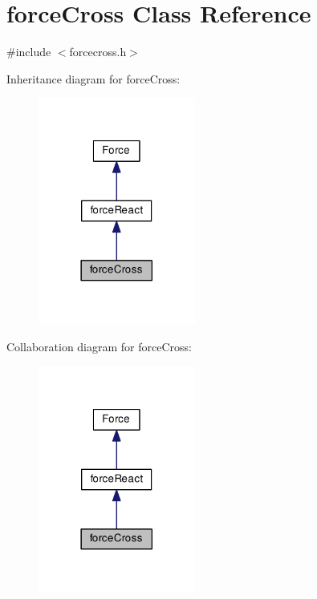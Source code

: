 \hypertarget{classforce_cross}{\section{force\-Cross Class Reference}
\label{classforce_cross}
}


{\ttfamily \#include $<$forcecross.\-h$>$}



Inheritance diagram for force\-Cross\-:\nopagebreak
\begin{figure}[H]
\begin{center}
\leavevmode
\includegraphics[width=146pt]{classforce_cross__inherit__graph}
\end{center}
\end{figure}


Collaboration diagram for force\-Cross\-:\nopagebreak
\begin{figure}[H]
\begin{center}
\leavevmode
\includegraphics[width=146pt]{classforce_cross__coll__graph}
\end{center}
\end{figure}
